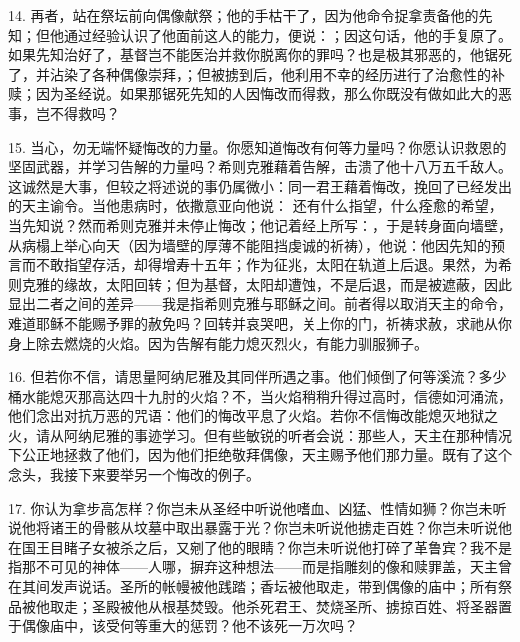 14. 再者，站在祭坛前向偶像献祭；他的手枯干了，因为他命令捉拿责备他的先知；但他通过经验认识了他面前这人的能力，便说：；因这句话，他的手复原了。如果先知治好了，基督岂不能医治并救你脱离你的罪吗？也是极其邪恶的，他锯死了，并沾染了各种偶像崇拜，；但被掳到后，他利用不幸的经历进行了治愈性的补赎；因为圣经说。如果那锯死先知的人因悔改而得救，那么你既没有做如此大的恶事，岂不得救吗？\par

15. 当心，勿无端怀疑悔改的力量。你愿知道悔改有何等力量吗？你愿认识救恩的坚固武器，并学习告解的力量吗？希则克雅藉着告解，击溃了他十八万五千敌人。这诚然是大事，但较之将述说的事仍属微小：同一君王藉着悔改，挽回了已经发出的天主谕令。当他患病时，依撒意亚向他说： 还有什么指望，什么痊愈的希望，当先知说？然而希则克雅并未停止悔改；他记着经上所写：，于是转身面向墙壁，从病榻上举心向天（因为墙壁的厚薄不能阻挡虔诚的祈祷），他说：他因先知的预言而不敢指望存活，却得增寿十五年；作为征兆，太阳在轨道上后退。果然，为希则克雅的缘故，太阳回转；但为基督，太阳却遭蚀，不是后退，而是被遮蔽，因此显出二者之间的差异——我是指希则克雅与耶稣之间。前者得以取消天主的命令，难道耶稣不能赐予罪的赦免吗？回转并哀哭吧，关上你的门，祈祷求赦，求祂从你身上除去燃烧的火焰。因为告解有能力熄灭烈火，有能力驯服狮子。\par

16. 但若你不信，请思量阿纳尼雅及其同伴所遇之事。他们倾倒了何等溪流？多少桶水能熄灭那高达四十九肘的火焰？不，当火焰稍稍升得过高时，信德如河涌流，他们念出对抗万恶的咒语：他们的悔改平息了火焰。若你不信悔改能熄灭地狱之火，请从阿纳尼雅的事迹学习。但有些敏锐的听者会说：那些人，天主在那种情况下公正地拯救了他们，因为他们拒绝敬拜偶像，天主赐予他们那力量。既有了这个念头，我接下来要举另一个悔改的例子。\par

17. 你认为拿步高怎样？你岂未从圣经中听说他嗜血、凶猛、性情如狮？你岂未听说他将诸王的骨骸从坟墓中取出暴露于光？你岂未听说他掳走百姓？你岂未听说他在国王目睹子女被杀之后，又剜了他的眼睛？你岂未听说他打碎了革鲁宾？我不是指那不可见的神体——人哪，摒弃这种想法——而是指雕刻的像和赎罪盖，天主曾在其间发声说话。圣所的帐幔被他践踏；香坛被他取走，带到偶像的庙中；所有祭品被他取走；圣殿被他从根基焚毁。他杀死君王、焚烧圣所、掳掠百姓、将圣器置于偶像庙中，该受何等重大的惩罚？他不该死一万次吗？\par


